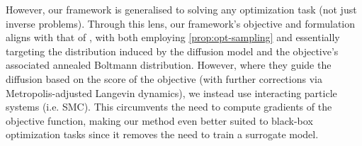 However, our framework is generalised to solving any optimization task (not just inverse problems).
Through this lens, our framework's objective and formulation aligns with that of
\cite{kongDiffusionModelsConstrained2024}, with both employing \ref{prop:opt-sampling} and
essentially targeting the distribution induced by the diffusion model and the objective's
associated annealed Boltmann distribution. However, where they guide the diffusion based on the
score of the objective (with further corrections via Metropolis-adjusted Langevin dynamics), we
instead use interacting particle systems (i.e. SMC). This circumvents the need to compute gradients
of the objective function, making our method even better suited to black-box optimization tasks
since it removes the need to train a surrogate model.
